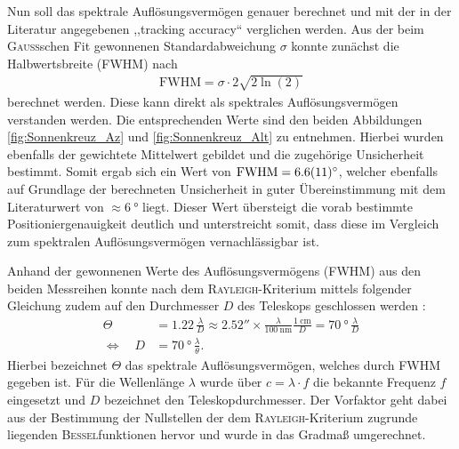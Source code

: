     Nun soll das spektrale Auflösungsvermögen genauer berechnet und mit der in der Literatur angegebenen ,,tracking accuracy`` verglichen werden.
    Aus der beim \textsc{Gauß}schen Fit gewonnenen Standardabweichung $\sigma$ konnte zunächst die Halbwertsbreite (FWHM) nach \cite{FWHM}
    \begin{align}
        \text{FWHM} = \sigma \cdot 2\sqrt{2\ln(2)} \label{eq:FWHM}
    \end{align}
    berechnet werden.
    Diese kann direkt als spektrales Auflösungsvermögen verstanden werden.
    Die entsprechenden Werte sind den beiden Abbildungen \ref{fig:Sonnenkreuz_Az} und \ref{fig:Sonnenkreuz_Alt} zu entnehmen. Hierbei wurden ebenfalls der gewichtete Mittelwert gebildet und die zugehörige Unsicherheit bestimmt.
    Somit ergab sich ein Wert von $\text{FWHM} = \SI{6.6 \pm 1.1}{\degree}$, welcher ebenfalls auf Grundlage der berechneten Unsicherheit in guter Übereinstimmung mit dem Literaturwert von $\approx \SI{6}{\degree}$ \cite{Usermanual} liegt. 
    Dieser Wert übersteigt die vorab bestimmte Positioniergenauigkeit deutlich und unterstreicht somit, dass diese im Vergleich zum spektralen Auflösungsvermögen vernachlässigbar ist.

    Anhand der gewonnenen Werte des Auflösungsvermögens (FWHM) aus den beiden Messreihen konnte nach dem \textsc{Rayleigh}-Kriterium mittels folgender Gleichung zudem auf den Durchmesser $D$ des Teleskops geschlossen werden \cite{Karttunen2013}:
    \begin{align}
        \Theta &= 1.22 \, \frac{\lambda}{D} \approx \ang{;;2.52} \times \frac{\lambda}{\SI{100}{\nano \metre}} \frac{\SI{1}{\centi \metre}}{D} = \SI{70}{\degree} \, \frac{\lambda}{D}\\
        \Leftrightarrow \quad D &= \SI{70}{\degree} \, \frac{\lambda}{\theta}.
    \end{align}
    Hierbei bezeichnet $\Theta$ das spektrale Auflösungsvermögen, welches durch FWHM gegeben ist. Für die Wellenlänge $\lambda$ wurde über $c = \lambda \cdot f$ die bekannte Frequenz $f$ eingesetzt und $D$ bezeichnet den Teleskopdurchmesser.
    Der Vorfaktor geht dabei aus der Bestimmung der Nullstellen der dem \textsc{Rayleigh}-Kriterium zugrunde liegenden \textsc{Bessel}funktionen hervor und wurde in das Gradmaß umgerechnet.

